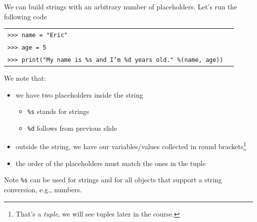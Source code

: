 \documentclass[t,handout,9pt]{beamer}
\begin{document}
\begin{frame}
\vfill
We can build strings with an arbitrary number of placeholders.
\vfill
Let's run the following code
\begin{table}[]
\begin{tabular}{ll}
\texttt{>{}>{}> name = "Eric"} & \\
\texttt{>{}>{}> age = 5} & \\
\texttt{>{}>{}> print("My name is \%s and I'm \%d years old." \%(name, age))} & \\
\end{tabular}
\end{table}
\vfill
We note that:
\begin{itemize}
	\item we have two placeholders inside the string
	\begin{itemize}
		\item \texttt{\%s} stands for strings
		\item \texttt{\%d} follows from previous slide
	\end{itemize}
	\item outside the string, we have our variables/values collected in round brackets\footnote{That's a \textit{tuple}, we will see tuples later in the course.}
	\item the order of the placeholders must match the ones in the tuple
\end{itemize}
\vfill
\begin{block}{Note}
\texttt{\%s} can be used for strings and for all objects that support a string conversion, e.g., numbers.
\end{block}
\vfill
\end{frame}
%
\end{document}
